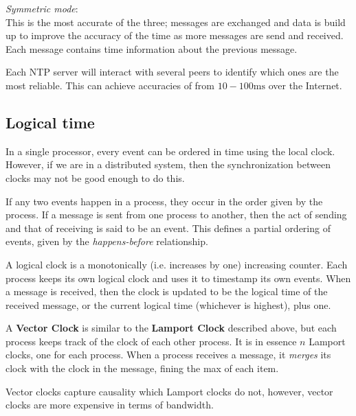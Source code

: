 \begin{description}
\begin{description}
      \item \textit{Symmetric mode}:\\
        This is the most accurate of the three; messages are exchanged and data
        is build up to improve the accuracy of the time as more messages are 
        send and received. Each message contains time information about the
        previous message.

        Each NTP server will interact with several peers to identify which ones
        are the most reliable. This can achieve accuracies of from
        $10-100\si{\milli\second}$ over the Internet.
    \end{description}
\end{description}

\subsection{Logical time}

In a single processor, every event can be ordered in time using the local clock.
However, if we are in a distributed system, then the synchronization between
clocks may not be good enough to do this.

If any two events happen in a process, they occur in the order given by the
process. If a message is sent from one process to another, then the act of
sending and that of receiving is said to be an event. This defines a partial
ordering of events, given by the \textit{happens-before} relationship.

A logical clock is a monotonically (i.e. increases by one) increasing counter.
Each process keeps its own logical clock and uses it to timestamp its own
events. When a message is received, then the clock is updated to be the logical
time of the received message, or the current logical time (whichever is
highest), plus one.

A \textbf{Vector Clock} is similar to the \textbf{Lamport Clock} described
above, but each process keeps track of the clock of each other process. It is in
essence $n$ Lamport clocks, one for each process. When a process receives a
message, it \textit{merges} its clock with the clock in the message, fining the
max of each item.

Vector clocks capture causality which Lamport clocks do not, however, vector
clocks are more expensive in terms of bandwidth.
